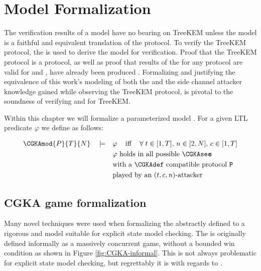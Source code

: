 \hypertarget{sec:model-formalization}{%
\chapter{Model Formalization}\label{sec:model-formalization}}

The verification results of a model have no bearing on TreeKEM unless the model is a faithful and equivalent translation of the protocol.
To verify the TreeKEM protocol, the \CGKAsec is used to derive the model for verification.
Proof that the TreeKEM protocol is a  protocol, as well as proof that results of the \CGKAsec for any  protocol are valid for  and , have already been produced \autocite{alwen2020security}.
Formalizing and justifying the equivalence of this work's modeling of both the \CGKAsec and the side channel attacker knowledge gained while observing the TreeKEM protocol, is pivotal to the soundness of verifying  and  for TreeKEM.

Within this chapter we will formalize a parameterized model .
For a given LTL predicate $\varphi$ we define  as follows:

\[
\begin{split}
\CGKAmod{P}{T}{N}\quad\models\quad& \varphi \;\;\;\textrm{ iff }\;\;\;\forall\; t \in [1, T],\, n \in [2, N],\, c \in [1, T]\\
  & \varphi \textrm{ holds in all possible \CGKAsec\!\!s}\\
  & \textrm{with a \CGKAdef compatible protocol } \mathtt{P}\\
  & \textrm{played by an } (t, c, n)\textrm{-attacker}
\end{split}
\]


\hypertarget{sec:game-adaptations}{%
\section{CGKA game formalization}\label{sec:game-adaptations}}

Many novel techniques were used when formalizing the abstractly defined \CGKAsec to a rigorous and model suitable for explicit state model checking.
The \CGKAsec is originally defined informally as a massively concurrent game, without a bounded win condition as shown in Figure \ref{fig:CGKA-informal}.
This is not always problematic for explicit state model checking, but regrettably it is with regards to \CGKAsec.

